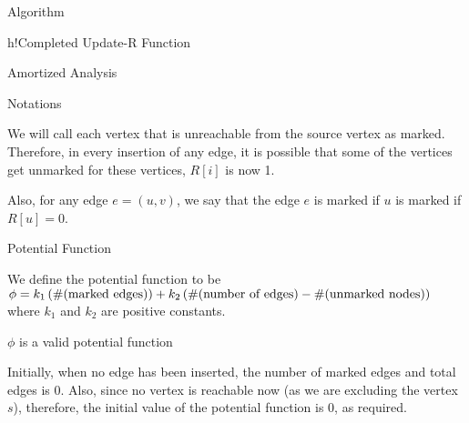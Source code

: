 \documentclass{article}
\begin{document}
\begin{question}

    \begin{qsection}{Algorithm}

        \begin{algo}[0.9\textwidth]{h!}{Completed Update-R Function}
            \begin{algorithmic}
                        \EndFor%
                    \EndIf%
                \EndProcedure%
            \end{algorithmic}
        \end{algo}

    \end{qsection}

    \begin{qsection}{Amortized Analysis}

        \begin{qsubsection}{Notations}

            We will call each vertex that is unreachable from the source vertex as marked. Therefore, in every insertion of any edge, it is possible that some of the vertices get unmarked  for these vertices, $R[i]$ is now 1. \br%

            Also, for any edge $e = (u, v)$, we say that the edge $e$ is marked if $u$ is marked  if $R[u] = 0$.

        \end{qsubsection}

        \begin{qsubsection}{Potential Function}

            We define the potential function to be $\phi = k_1 \left( {\#(\text{marked edges})} \right) + k_2 \left( {\#(\text{number of edges}) - \#(\text{unmarked nodes})} \right)$ where $k_1$ and $k_2$ are positive constants. \br%

             \br%

            \begin{qproof}{$\phi$ is a valid potential function}

                Initially, when no edge has been inserted, the number of marked edges and total edges is 0. Also, since no vertex is reachable now (as we are excluding the vertex $s$), therefore, the initial value of the potential function is 0, as required. \br%


\end{qproof}
\end{qsubsection}
\end{qsection}
\end{question}
\end{document}
